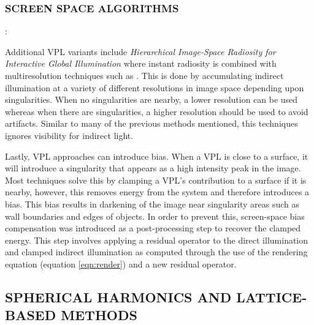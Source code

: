 \subsubsection{SCREEN SPACE ALGORITHMS}: 

Additional VPL variants include \textit{Hierarchical Image-Space Radiosity for Interactive Global Illumination} \cite{Nichols2009} where instant radiosity is combined with multiresolution techniques such as \cite{Nichols2009a}.  This is done by accumulating indirect illumination at a variety of different resolutions in image space depending upon singularities.  When no singularities are nearby, a lower resolution can be used whereas when there are singularities, a higher resolution should be used to avoid artifacts.  Similar to many of the previous methods mentioned, this techniques ignores visibility for indirect light.

Lastly, VPL approaches can introduce bias.  When a VPL is close to a surface, it will introduce a singularity that appears as a high intensity peak in the image.  Most techniques solve this by clamping a VPL's contribution to a surface if it is nearby, however, this removes energy from the system and therefore introduces a bias.  This bias results in darkening of the image near singularity areas such as wall boundaries and edges of objects.  In order to prevent this, screen-space bias compensation \cite{Novak2011} was introduced as a post-processing step to recover the clamped energy.  This step involves applying a residual operator to the direct illumination and clamped indirect illumination as computed through the use of the rendering equation (equation \ref{eqn:render}) and a new residual operator.

\subsection{SPHERICAL HARMONICS AND LATTICE-BASED METHODS}

